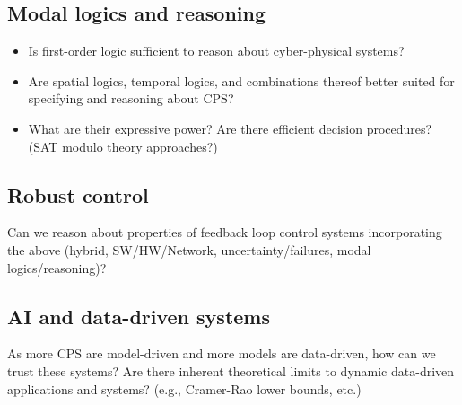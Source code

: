 \documentclass[
graybox,
envcountchap
]{svmult}
\begin{document}
\begin{bibunit}
    \subsection{Modal logics and reasoning}
    
    \begin{itemize}
    \item  Is first-order logic sufficient to reason about cyber-physical systems?
    \item Are spatial logics, temporal logics, and combinations thereof better suited for specifying and reasoning about CPS?
    \item What are their expressive power?   Are there efficient decision procedures?  (SAT modulo theory approaches?)
    \end{itemize}

    \subsection{Robust control}

    Can we reason about properties of feedback loop control systems incorporating the above (hybrid, SW/HW/Network, uncertainty/failures, modal logics/reasoning)?
    
    \subsection{AI and data-driven systems}

    As more CPS are model-driven and more models are data-driven, how can we trust these systems?  Are there inherent theoretical limits to dynamic data-driven applications and systems? (e.g., Cramer-Rao lower bounds, etc.)

	
	
	
	

\end{bibunit}
\end{document}
